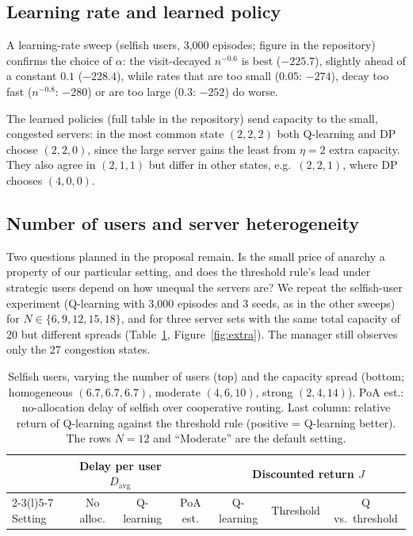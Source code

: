 \documentclass{article}
\begin{document}
\subsection{Learning rate and learned policy}\label{sec:alpha}
A learning-rate sweep (selfish users, 3{,}000 episodes; figure in the repository) confirms
the choice of $\alpha$: the visit-decayed $n^{-0.6}$ is best ($-225.7$), slightly ahead of a
constant $0.1$ ($-228.4$), while rates that are too small ($0.05$: $-274$), decay too fast
($n^{-0.8}$: $-280$) or are too large ($0.3$: $-252$) do worse.

The learned policies (full table in the repository) send capacity to the small, congested
servers: in the most common state $(2,2,2)$ both Q-learning and DP choose $(2,2,0)$, since
the large server gains the least from $\eta=2$ extra capacity. They also agree in $(2,1,1)$
but differ in other states, e.g.\ $(2,2,1)$, where DP chooses $(4,0,0)$.

\subsection{Number of users and server heterogeneity}\label{sec:extra}
Two questions planned in the proposal remain. Is the small price of anarchy a property of
our particular setting, and does the threshold rule's lead under strategic users depend on
how unequal the servers are? We repeat the selfish-user
experiment (Q-learning with 3{,}000 episodes and 3 seeds, as in the other sweeps) for
$N\in\{6,9,12,15,18\}$, and for three server sets with the same total capacity of 20 but
different spreads (Table~\ref{tab:extra}, Figure~\ref{fig:extra}). The manager still observes
only the 27 congestion states.

\begin{table}[t]
\centering\small
\begin{tabular}{@{}lcccccc@{}}
\toprule
& \multicolumn{2}{c}{Delay per user $D_{\mathrm{avg}}$} & & \multicolumn{3}{c}{Discounted return $J$}\\
\cmidrule(lr){2-3}\cmidrule(l){5-7}
Setting & No alloc. & Q-learning & PoA est. & Q-learning & Threshold & Q vs.\ threshold\\
\midrule

\end{tabular}
\caption{Selfish users, varying the number of users (top) and the capacity spread
(bottom; homogeneous $(6.7,6.7,6.7)$, moderate $(4,6,10)$, strong $(2,4,14)$). PoA est.:
no-allocation delay of selfish over cooperative routing. Last column: relative return of
Q-learning against the threshold rule (positive = Q-learning better). The rows $N=12$ and
``Moderate'' are the default setting.}
\label{tab:extra}
\end{table}
\end{document}
